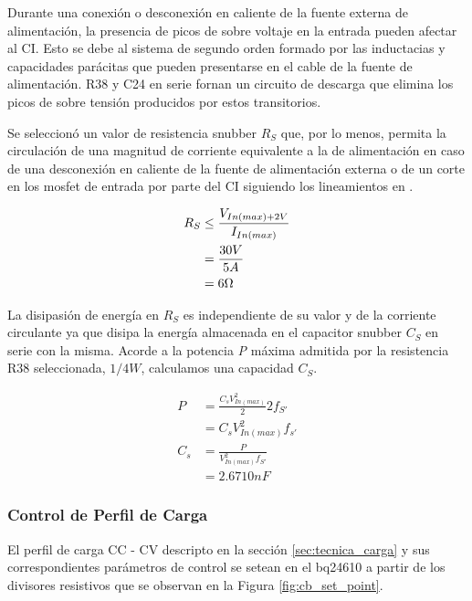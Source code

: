 \documentclass[10pt, a4paper]{report}
\begin{document}
Durante una conexión o desconexión en caliente de la fuente externa de
alimentación, la presencia de picos de sobre voltaje en la entrada pueden
afectar al \acrshort{CI}. Esto se debe al sistema de segundo orden formado por
las inductacias y capacidades parácitas que pueden presentarse en el cable de la
fuente de alimentación. R38 y C24 en serie fornan un circuito de descarga que
elimina los picos de sobre tensión producidos por estos transitorios.

Se seleccionó un valor de resistencia snubber $R_{S}$ que, por lo menos, permita
la circulación de una magnitud de corriente equivalente a la de alimentación en
caso de una desconexión en caliente de la fuente de alimentación externa o de un
corte en los mosfet de entrada por parte del \acrshort{CI} siguiendo los
lineamientos en \cite{CD_RC_Snubber_AN}.  

\begin{align}
    R_{S} &\leq \frac{V_{In (max)+2V}}{I_{In (max)}}\\
    &=\frac{30V}{5A}\\
    &=6\ohm
\end{align}

La disipasión de energía en $R_{S}$ es independiente de su valor y de la
corriente circulante ya que disipa la energía almacenada en el capacitor snubber
$C_{S}$ en serie con la misma. Acorde a la potencia \emph{P} máxima admitida
por la resistencia R38 seleccionada, $1/4W$, calculamos una capacidad $C_{S}$. 

\begin{align}
    P&=\frac{C_{s}V_{In (max)}^{2}}{2}2f_{S'}\\
    &=C_{s}V_{In (max)}^{2}f_{s'}\\
    C_{s}&=\frac{P}{V_{In (max)}^{2}f_{S'}}\\
    &=2.6710nF
\end{align}
   
\subsubsection{Control de Perfil de Carga}

El perfil de carga \acrshort{CC} - \acrshort{CV} descripto en la sección
\ref{sec:tecnica_carga} y sus correspondientes parámetros de control se setean
en el bq24610 a partir de los divisores resistivos que se observan en la Figura
\ref{fig:cb_set_point}.
\end{document}
